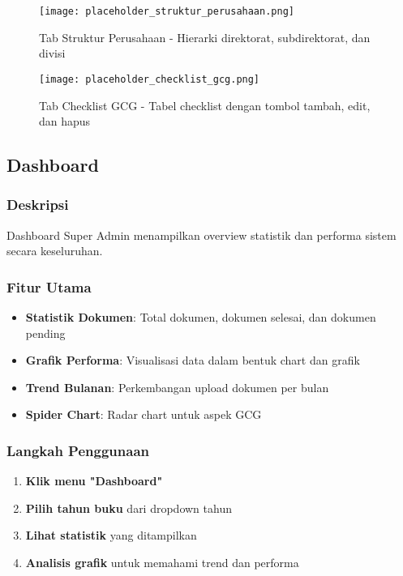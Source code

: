 \documentclass[12pt,a4paper]{article}
\begin{document}
\begin{figure}[H]
    \centering
    \texttt{[image: placeholder\_struktur\_perusahaan.png]}
    \caption{Tab Struktur Perusahaan - Hierarki direktorat, subdirektorat, dan divisi}
    \label{fig:struktur_perusahaan}
\end{figure}

\begin{figure}[H]
    \centering
    \texttt{[image: placeholder\_checklist\_gcg.png]}
    \caption{Tab Checklist GCG - Tabel checklist dengan tombol tambah, edit, dan hapus}
    \label{fig:checklist_gcg}
\end{figure}

\newpage

\subsection{Dashboard}

\subsubsection{Deskripsi}
Dashboard Super Admin menampilkan overview statistik dan performa sistem secara keseluruhan.

\subsubsection{Fitur Utama}
\begin{itemize}
    \item \textbf{Statistik Dokumen}: Total dokumen, dokumen selesai, dan dokumen pending
    \item \textbf{Grafik Performa}: Visualisasi data dalam bentuk chart dan grafik
    \item \textbf{Trend Bulanan}: Perkembangan upload dokumen per bulan
    \item \textbf{Spider Chart}: Radar chart untuk aspek GCG
\end{itemize}

\subsubsection{Langkah Penggunaan}
\begin{enumerate}
    \item \textbf{Klik menu "Dashboard"}
    \item \textbf{Pilih tahun buku} dari dropdown tahun
    \item \textbf{Lihat statistik} yang ditampilkan
    \item \textbf{Analisis grafik} untuk memahami trend dan performa
\end{enumerate}
\end{document}
